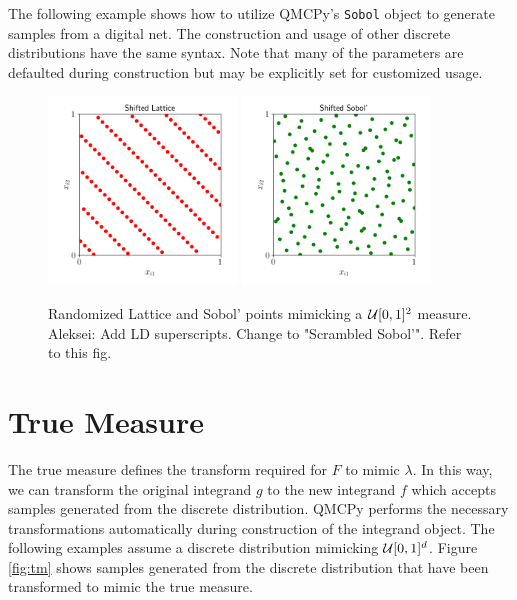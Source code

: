 \documentclass[graybox,footinfo]{svmult}
\newcommand{\AGSComment}[1]{{\color{cyan} Aleksei: #1}}
\begin{document}
The following example shows how to utilize QMCPy's \texttt{Sobol} object to generate samples from a digital net. The construction and usage of other discrete distributions have the same syntax. Note that many of the parameters are defaulted during construction but may be explicitly set for customized usage. 



\begin{figure}
	\includegraphics[height=5cm]{ags/figs/dd.lattice.png}
	\qquad
	\includegraphics[height=5cm]{ags/figs/dd.sobol.png}
	\caption{Randomized Lattice and Sobol' points mimicking a ${\mathcal{U}}[0,1]^2$ measure. \AGSComment{Add LD superscripts. Change to "Scrambled Sobol'". Refer to this fig.}}
	\label{fig:dd_iid}
\end{figure}

\section{True Measure}

The true measure defines the transform required for $F$ to mimic $\lambda$. In this way, we can transform the original integrand $g$ to the new integrand $f$ which accepts samples generated from the discrete distribution. QMCPy performs the necessary transformations automatically during construction of the integrand object. The following examples assume a discrete distribution mimicking ${\mathcal{U}}[0,1]^d$. Figure \ref{fig:tm} shows samples generated from the discrete distribution that have been transformed to mimic the true measure.
\end{document}
